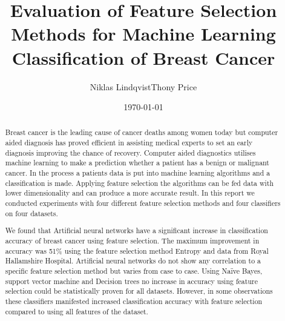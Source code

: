 \documentclass{kththesis}
\title{Evaluation of Feature Selection Methods for Machine Learning Classification of Breast Cancer}
\author{Niklas Lindqvist\newline Thony Price}
\date{\today}
\begin{document}

\frontmatter
\titlepage



\begin{abstract}

  Breast cancer is the leading cause of cancer deaths among women today but computer aided diagnosis has proved efficient in assisting medical experts to set an early diagnosis improving the chance of recovery. Computer aided diagnostics utilises machine learning to make a prediction whether a patient has a benign or malignant cancer. In the process a patients data is put into machine learning algorithms and a classification is made. Applying feature selection the algorithms can be fed data with lower dimensionality and can produce a more accurate result. In this report we conducted experiments with four different feature selection methods and four classifiers on four datasets.

  We found that Artificial neural networks have a significant increase in classification accuracy of breast cancer using feature selection. The maximum improvement in accuracy was 51\% using the feature selection method Entropy and data from Royal Hallamshire Hospital. Artificial neural networks do not show any correlation to a specific feature selection method but varies from case to case. Using Naïve Bayes, support vector machine and Decision trees no increase in accuracy using feature selection could be statistically proven for all datasets. However, in some observations these classifiers manifested increased classification accuracy with feature selection compared to using all features of the dataset.

\end{abstract}


\end{document}
